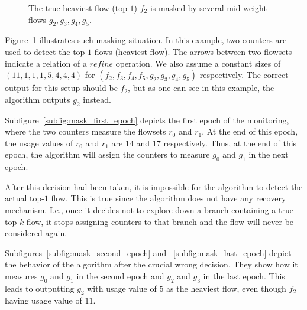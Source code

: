 \begin{figure}
{
    }
    \caption{The true heaviest flow (top-$1$) $f_2$ is masked by several mid-weight flows $g_2, g_3, g_4, g_5$.}
    \label{fig:mask}
\end{figure}

Figure~\ref{fig:mask} illustrates such masking situation. In this example, two counters are used to detect the top-$1$ flows (heaviest flow). The arrows between two flowsets indicate a relation of a $refine$ operation. We also assume a constant sizes of $(11, 1, 1, 1, 5, 4, 4, 4)$ for $(f_2, f_3, f_4, f_5, g_2, g_3, g_4, g_5)$ respectively. The correct output for this setup should be $f_2$, but as one can see in this example, the algorithm outputs $g_2$ instead.

Subfigure~\ref{subfig:mask_first_epoch} depicts the first epoch of the monitoring, where the two counters measure the flowsets $r_0$ and $r_1$. At the end of this epoch, the usage values of $r_0$ and $r_1$ are $14$ and $17$ respectively. Thus, at the end of this epoch, the algorithm will assign the counters to measure $g_0$ and $g_1$ in the next epoch.

After this decision had been taken, it is impossible for the algorithm to detect the actual top-$1$ flow. This is true since the algorithm does not have any recovery mechanism. I.e., once it decides not to explore down a branch containing a true top-$k$ flow, it stops assigning counters to that branch and the flow will never be considered again.

Subfigures~\ref{subfig:mask_second_epoch} and ~\ref{subfig:mask_last_epoch} depict the behavior of the algorithm after the crucial wrong decision. They show how it measures $g_0$ and $g_1$ in the second epoch and $g_2$ and $g_3$ in the last epoch. This leads to outputting $g_2$ with usage value of $5$ as the heaviest flow, even though $f_2$ having usage value of $11$.

